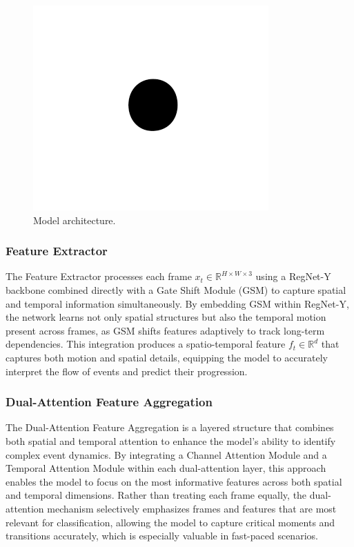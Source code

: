 \documentclass[conference]{IEEEtran}
\begin{document}
\begin{figure}[htbp]
    \centerline{\includegraphics{fig1.png}}
    \caption{Model architecture.}
    \label{fig}
    \end{figure}
\subsubsection{Feature Extractor}
The Feature Extractor processes each frame \( x_t \in \mathbb{R}^{H \times W \times 3} \) using a RegNet-Y backbone combined directly with a Gate Shift Module (GSM) to capture spatial and temporal information simultaneously. By embedding GSM within RegNet-Y, the network learns not only spatial structures but also the temporal motion present across frames, as GSM shifts features adaptively to track long-term dependencies. This integration produces a spatio-temporal feature \( f_t \in \mathbb{R}^d \) that captures both motion and spatial details, equipping the model to accurately interpret the flow of events and predict their progression.

\subsubsection{Dual-Attention Feature Aggregation}
The Dual-Attention Feature Aggregation is a layered structure that combines both spatial and temporal attention to enhance the model's ability to identify complex event dynamics. By integrating a Channel Attention Module and a Temporal Attention Module within each dual-attention layer, this approach enables the model to focus on the most informative features across both spatial and temporal dimensions. Rather than treating each frame equally, the dual-attention mechanism selectively emphasizes frames and features that are most relevant for classification, allowing the model to capture critical moments and transitions accurately, which is especially valuable in fast-paced scenarios.
\end{document}
